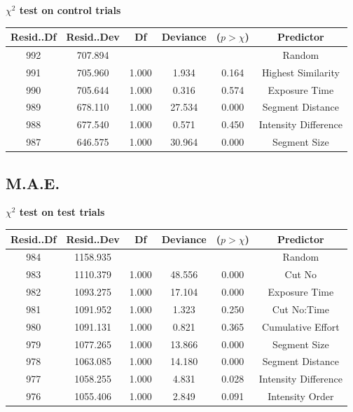 \documentclass{article}
\begin{document}
\label{table:participantsAnovaGOControl}    
\textbf{$\chi^2$ test on control trials}
\begin{table}[ht]
    \centering    
    \begin{tabular}{cccccc}
    \hline
    Resid..Df & Resid..Dev &    Df & Deviance & ($p > \chi$) &    Predictor \\
    \hline
      992 &    707.894 &       &          &            &             Random \\
      991 &    705.960 & 1.000 &    1.934 &      0.164 & Highest Similarity \\
      990 &    705.644 & 1.000 &    0.316 &      0.574 &          Exposure Time \\
      989 &    678.110 & 1.000 &   27.534 &      0.000 &          Segment Distance \\
      988 &    677.540 & 1.000 &    0.571 &      0.450 &         Intensity Difference \\
      987 &    646.575 & 1.000 &   30.964 &      0.000 &          Segment Size \\
    \hline
    \end{tabular}    
\end{table}
\clearpage


\subsection*{M.A.E.}
\label{table:participantsAnovaMAETest}
\textbf{$\chi^2$ test on test trials}
 
\begin{table}[ht]
    \centering
    \begin{tabular}{cccccc}
    \hline
    Resid..Df & Resid..Dev &    Df & Deviance & ($p > \chi$) &    Predictor \\
    \hline
          984 &   1158.935 &       &          &            &       Random \\
          983 &   1110.379 & 1.000 &   48.556 &      0.000 &       Cut No \\
          982 &   1093.275 & 1.000 &   17.104 &      0.000 &    Exposure Time \\
          981 &   1091.952 & 1.000 &    1.323 &      0.250 &  Cut No:Time \\
          980 &   1091.131 & 1.000 &    0.821 &      0.365 & Cumulative Effort \\
          979 &   1077.265 & 1.000 &   13.866 &      0.000 &    Segment Size \\
          978 &   1063.085 & 1.000 &   14.180 &      0.000 &    Segment Distance \\
          977 &   1058.255 & 1.000 &    4.831 &      0.028 &   Intensity Difference \\
          976 &   1055.406 & 1.000 &    2.849 &      0.091 &     Intensity Order \\
    \hline
    \end{tabular}
\end{table}
\end{document}
